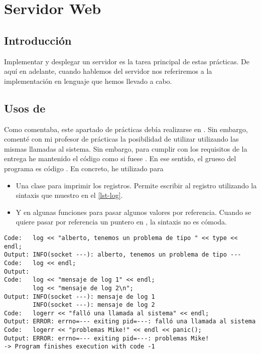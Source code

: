 \section{Servidor Web \HTTP}
\subsection{Introducción}
Implementar y desplegar un servidor {\HTTP} es la tarea principal de estas prácticas. De aquí en adelante, cuando hablemos del servidor nos referiremos a la implementación en lenguaje {\Clang} que hemos llevado a cabo.


\subsection{Usos de \Cplusplus}
Como comentaba, este apartado de prácticas debía realizarse en \Clang. Sin embargo, comenté con mi profesor de prácticas la posibilidad de utilizar \Cplusplus utilizando las mismas llamadas al sistema. Sin embargo, para cumplir con los requisitos de la entrega he mantenido el código como si fuese \Clang. En ese sentido, el grueso del programa es código \Clang. En concreto, he utilizado \Cplusplus para

\begin{itemize}
\item Una clase para imprimir los registros. Permite escribir al registro utilizando la sintaxis que muestro en el \cref{lst-log}.

\item Y en algunas funciones para pasar algunos valores por referencia. Cuando se quiere pasar por referencia un puntero en \Clang, la sintaxis no es cómoda.
\end{itemize}

\begin{lstlisting}[caption=Uso de las clases \code{log} y \code{logerr}, label=lst-log]
Code:   log << "alberto, tenemos un problema de tipo " << type << endl;
Output: INFO(socket ---): alberto, tenemos un problema de tipo ---
Code:   log << endl;
Output:
Code:   log << "mensaje de log 1" << endl;
        log << "mensaje de log 2\n";
Output: INFO(socket ---): mensaje de log 1
        INFO(socket ---): mensaje de log 2
Code:   logerr << "falló una llamada al sistema" << endl;
Output: ERROR: errno=--- exiting pid=---: falló una llamada al sistema
Code:   logerr << "problemas Mike!" << endl << panic();
Output: ERROR: errno=--- exiting pid=---: problemas Mike!
-> Program finishes execution with code -1
\end{lstlisting}


